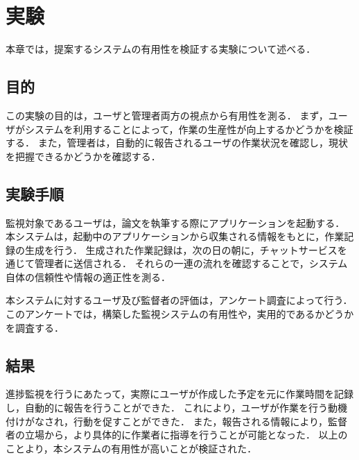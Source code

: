 \section{実験}
本章では，提案するシステムの有用性を検証する実験について述べる．

\subsection{目的}
この実験の目的は，ユーザと管理者両方の視点から有用性を測る．
まず，ユーザがシステムを利用することによって，作業の生産性が向上するかどうかを検証する．
また，管理者は，自動的に報告されるユーザの作業状況を確認し，現状を把握できるかどうかを確認する．

\subsection{実験手順}
監視対象であるユーザは，論文を執筆する際にアプリケーションを起動する．
本システムは，起動中のアプリケーションから収集される情報をもとに，作業記録の生成を行う．
生成された作業記録は，次の日の朝に，チャットサービスを通じて管理者に送信される．
それらの一連の流れを確認することで，システム自体の信頼性や情報の適正性を測る．

本システムに対するユーザ及び監督者の評価は，アンケート調査によって行う．
このアンケートでは，構築した監視システムの有用性や，実用的であるかどうかを調査する．

\subsection{結果}
進捗監視を行うにあたって，実際にユーザが作成した予定を元に作業時間を記録し，自動的に報告を行うことができた．
これにより，ユーザが作業を行う動機付けがなされ，行動を促すことができた．
また，報告される情報により，監督者の立場から，より具体的に作業者に指導を行うことが可能となった．
以上のことより，本システムの有用性が高いことが検証された．
